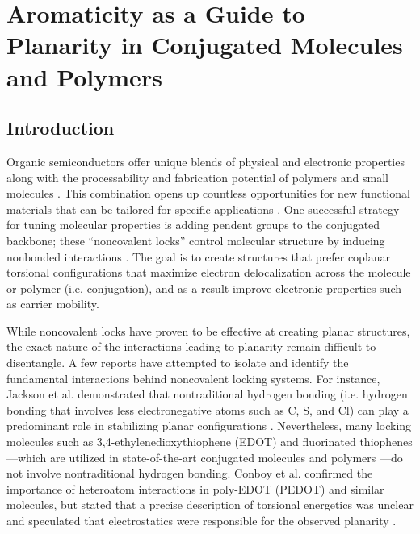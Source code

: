 \chapter{Aromaticity as a Guide to Planarity in Conjugated Molecules and Polymers}

\section{Introduction}

Organic semiconductors offer unique blends of physical and electronic properties along with the processability and fabrication potential of polymers and small molecules \cite{Kuei2017, Swager2017}. This combination opens up countless opportunities for new functional materials that can be tailored for specific applications \cite{Mei2013, Muench2016, Someya2016, VanDeBurgt2018}. One successful strategy for tuning molecular properties is adding pendent groups to the conjugated backbone; these ``noncovalent locks'' control molecular structure by inducing nonbonded interactions \cite{Jackson2013, Cheng2016, Conboy2016, Huang2017}. The goal is to create structures that prefer coplanar torsional configurations that maximize electron delocalization across the molecule or polymer (i.e. conjugation), and as a result improve electronic properties such as carrier mobility.

While noncovalent locks have proven to be effective at creating planar structures, the exact nature of the interactions leading to planarity remain difficult to disentangle. A few reports have attempted to isolate and identify the fundamental interactions behind  noncovalent locking systems. For instance, Jackson et al. demonstrated that nontraditional hydrogen bonding (i.e. hydrogen bonding that involves less electronegative atoms such as C, S, and Cl) can play a predominant role in stabilizing planar configurations \cite{Jackson2013}. Nevertheless, many locking molecules such as 3,4-ethylenedioxythiophene (EDOT) and fluorinated thiophenes---which are utilized in state-of-the-art conjugated molecules and polymers \cite{Yum2014, Granstrom1995, Wijsboom2011, Gao2015, Gao2018, Jo2014, Li2015}---do not involve nontraditional hydrogen bonding. Conboy et al. confirmed the importance of heteroatom interactions in poly-EDOT (PEDOT) and similar molecules, but stated that a precise description of torsional energetics was unclear and speculated that electrostatics were responsible for the observed planarity \cite{Conboy2016}.

